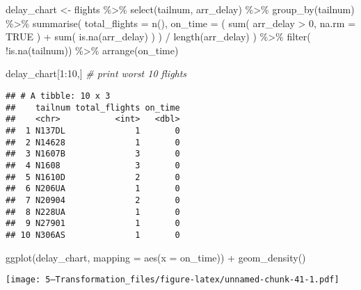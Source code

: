 \documentclass[
]{article}
\newenvironment{Shaded}{\begin{snugshade}}{\end{snugshade}}
\newcommand{\AttributeTok}[1]{\textcolor[rgb]{0.77,0.63,0.00}{#1}}
\newcommand{\CommentTok}[1]{\textcolor[rgb]{0.56,0.35,0.01}{\textit{#1}}}
\newcommand{\ConstantTok}[1]{\textcolor[rgb]{0.00,0.00,0.00}{#1}}
\newcommand{\DecValTok}[1]{\textcolor[rgb]{0.00,0.00,0.81}{#1}}
\newcommand{\FunctionTok}[1]{\textcolor[rgb]{0.00,0.00,0.00}{#1}}
\newcommand{\NormalTok}[1]{#1}
\newcommand{\OtherTok}[1]{\textcolor[rgb]{0.56,0.35,0.01}{#1}}
\newcommand{\SpecialCharTok}[1]{\textcolor[rgb]{0.00,0.00,0.00}{#1}}
\begin{document}
\begin{Shaded}
\begin{Highlighting}[]
\NormalTok{delay\_chart }\OtherTok{\textless{}{-}}\NormalTok{ flights }\SpecialCharTok{\%\textgreater{}\%} 
  \FunctionTok{select}\NormalTok{(tailnum, arr\_delay) }\SpecialCharTok{\%\textgreater{}\%} 
  \FunctionTok{group\_by}\NormalTok{(tailnum) }\SpecialCharTok{\%\textgreater{}\%}
  \FunctionTok{summarise}\NormalTok{( }\AttributeTok{total\_flights =} \FunctionTok{n}\NormalTok{(),}
             \AttributeTok{on\_time =}\NormalTok{ ( }\FunctionTok{sum}\NormalTok{( arr\_delay }\SpecialCharTok{\textgreater{}} \DecValTok{0}\NormalTok{, }\AttributeTok{na.rm =} \ConstantTok{TRUE}\NormalTok{ ) }\SpecialCharTok{+}
                         \FunctionTok{sum}\NormalTok{( }\FunctionTok{is.na}\NormalTok{(arr\_delay) ) }
\NormalTok{                       ) }\SpecialCharTok{/} \FunctionTok{length}\NormalTok{(arr\_delay) ) }\SpecialCharTok{\%\textgreater{}\%}
  \FunctionTok{filter}\NormalTok{( }\SpecialCharTok{!}\FunctionTok{is.na}\NormalTok{(tailnum)) }\SpecialCharTok{\%\textgreater{}\%} 
  \FunctionTok{arrange}\NormalTok{(on\_time)}

\NormalTok{delay\_chart[}\DecValTok{1}\SpecialCharTok{:}\DecValTok{10}\NormalTok{,] }\CommentTok{\# print worst 10 flights}
\end{Highlighting}
\end{Shaded}

\begin{verbatim}
## # A tibble: 10 x 3
##    tailnum total_flights on_time
##    <chr>           <int>   <dbl>
##  1 N137DL              1       0
##  2 N14628              1       0
##  3 N1607B              3       0
##  4 N1608               3       0
##  5 N1610D              2       0
##  6 N206UA              1       0
##  7 N20904              2       0
##  8 N228UA              1       0
##  9 N27901              1       0
## 10 N306AS              1       0
\end{verbatim}

\begin{Shaded}
\begin{Highlighting}[]
\FunctionTok{ggplot}\NormalTok{(delay\_chart, }\AttributeTok{mapping =} \FunctionTok{aes}\NormalTok{(}\AttributeTok{x =}\NormalTok{ on\_time)) }\SpecialCharTok{+}
    \FunctionTok{geom\_density}\NormalTok{() }
\end{Highlighting}
\end{Shaded}

\texttt{[image: 5---Transformation\_files/figure-latex/unnamed-chunk-41-1.pdf]}
\end{document}
